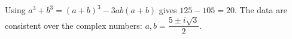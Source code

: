 Using $a^3+b^3=(a+b)^3-3ab(a+b)$ gives $125-105=\boxed{20}$. The data are consistent over the complex numbers: $a,b=\dfrac{5\pm i\sqrt3}{2}$.
